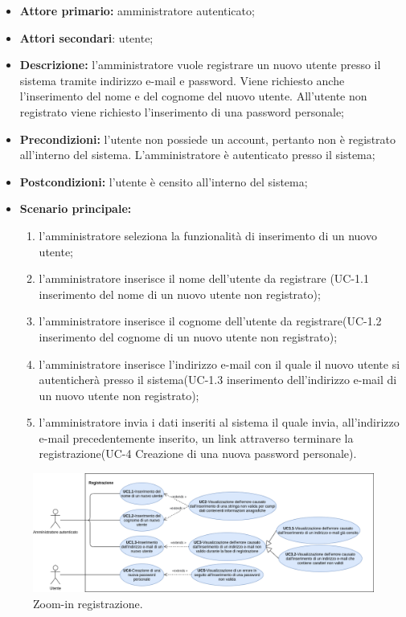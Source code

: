 \begin{itemize}
	\item \textbf{Attore primario:} amministratore autenticato;

	\item \textbf{Attori secondari}: utente;

	\item \textbf{Descrizione:} l'amministratore vuole registrare un nuovo utente presso il sistema tramite indirizzo e-mail e password. Viene richiesto anche l'inserimento del nome e del cognome del nuovo utente. All'utente non registrato viene richiesto l'inserimento di una password personale;

	\item \textbf{Precondizioni:} l'utente non possiede un account, pertanto non è registrato all'interno del sistema. L'amministratore è autenticato presso il sistema;

	\item \textbf{Postcondizioni:} l'utente è censito all'interno del sistema;

	\item \textbf{Scenario principale:}
	      \begin{enumerate}
		      \item l'amministratore seleziona la funzionalità di inserimento di un nuovo utente;
		      \item l'amministratore inserisce il nome dell'utente da registrare (UC-1.1 inserimento del nome di un nuovo utente non registrato);
		      \item l'amministratore inserisce il cognome dell'utente da registrare(UC-1.2 inserimento del cognome di un nuovo utente non registrato);
		      \item l'amministratore inserisce l'indirizzo e-mail con il quale il nuovo utente si autenticherà presso il sistema(UC-1.3 inserimento dell'indirizzo e-mail di un nuovo utente non registrato);
		      \item l'amministratore invia i dati inseriti al sistema il quale invia, all'indirizzo e-mail precedentemente inserito, un link attraverso terminare la registrazione(UC-4 Creazione di una nuova password personale).
	      \end{enumerate}
\end{itemize}

\begin{figure}[H]
	\centering
	  \includegraphics[width=\textwidth]{src/CasiDUso/immagini/SottocasiRegistrazione.png}
	\caption{Zoom-in registrazione.}
  \end{figure}

